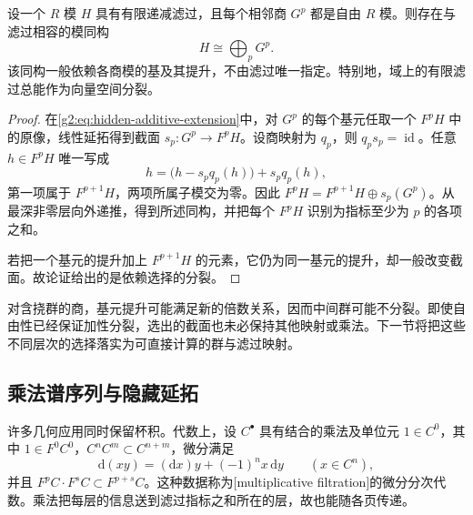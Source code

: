 \begin{proposition}\label{g2:prop:free-graded-splitting}
	设一个 \(R\) 模 \(H\) 具有有限递减滤过，且每个相邻商 \(G^p\) 都是自由 \(R\) 模。则存在与滤过相容的模同构
	\[
		H\cong\bigoplus_pG^p.
	\]
	该同构一般依赖各商模的基及其提升，不由滤过唯一指定。特别地，域上的有限滤过总能作为向量空间分裂。
\end{proposition}
\begin{proof}
	在\eqref{g2:eq:hidden-additive-extension}中，对 \(G^p\) 的每个基元任取一个 \(F^pH\) 中的原像，线性延拓得到截面 \(s_p:G^p\to F^pH\)。设商映射为 \(q_p\)，则 \(q_ps_p=\operatorname{id}\)。任意 \(h\in F^pH\) 唯一写成
	\[
		h=\bigl(h-s_pq_p(h)\bigr)+s_pq_p(h),
	\]
	第一项属于 \(F^{p+1}H\)，两项所属子模交为零。因此 \(F^pH=F^{p+1}H\oplus s_p(G^p)\)。从最深非零层向外递推，得到所述同构，并把每个 \(F^pH\) 识别为指标至少为 \(p\) 的各项之和。

	若把一个基元的提升加上 \(F^{p+1}H\) 的元素，它仍为同一基元的提升，却一般改变截面。故论证给出的是依赖选择的分裂。
\end{proof}

对含挠群的商，基元提升可能满足新的倍数关系，因而中间群可能不分裂。即使自由性已经保证加性分裂，选出的截面也未必保持其他映射或乘法。下一节将把这些不同层次的选择落实为可直接计算的群与滤过映射。

\subsection{乘法谱序列与隐藏延拓}
\label{g2:subsec:1004:05}

许多几何应用同时保留杯积。代数上，设 \(C^\bullet\) 具有结合的乘法及单位元 \(1\in C^0\)，其中 \(1\in F^0C^0\)，\(C^nC^m\subset C^{n+m}\)，微分满足
\[
	\mathrm d(xy)=(\mathrm dx)y+(-1)^nx\,\mathrm dy\qquad(x\in C^n),
\]
并且 \(F^pC\cdot F^sC\subset F^{p+s}C\)。这种数据称为[multiplicative filtration]的微分分次代数。乘法把每层的信息送到滤过指标之和所在的层，故也能随各页传递。

